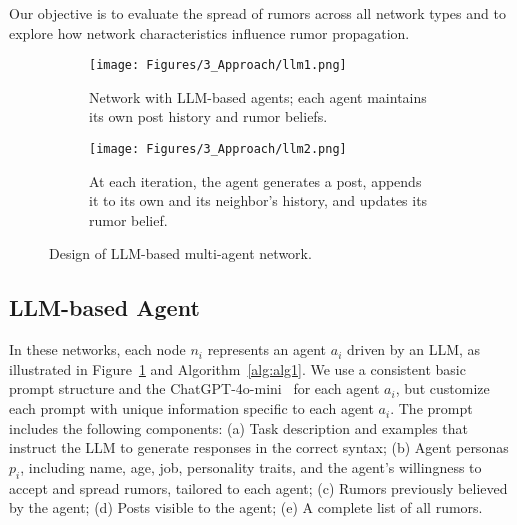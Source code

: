 \noindent Our objective is to evaluate the spread of rumors across all network types and to explore how network characteristics influence rumor propagation.

\begin{figure}[ht]
    \centering
    \begin{subfigure}[t]{0.21\textwidth}
        \centering
        \texttt{[image: Figures/3\_Approach/llm1.png]}
        \caption{Network with LLM-based agents; each agent maintains its own post history and rumor beliefs.}
        \label{fig:llm_a}
    \end{subfigure}
    \hspace{0.04\textwidth}
    \begin{subfigure}[t]{0.21\textwidth}
        \centering
        \texttt{[image: Figures/3\_Approach/llm2.png]}
        \caption{At each iteration, the agent generates a post, appends it to its own and its neighbor’s history, and updates its rumor belief.
        }
        \label{fig:llm_b}
    \end{subfigure}
    \vspace{-2ex}
    \caption{Design of LLM-based multi-agent network.}
    \label{fig:main_figure}
    \vspace{-2ex}
\end{figure}




\subsection{LLM-based Agent} 
In these networks, each node $n_i$ represents an agent $a_i$ driven by an LLM, as illustrated in Figure~\ref{fig:llm_a} and Algorithm~\ref{alg:alg1}. 
We use a consistent basic prompt structure and the ChatGPT-4o-mini~\cite{openai2024chatgpt} for each agent $a_i$, but customize each prompt with unique information specific to each agent $a_i$. 
The prompt includes the following components: 
(a) Task description and examples that instruct the LLM to generate responses in the correct syntax; 
(b) Agent personas $p_{i}$, including name, age, job, personality traits, and the agent’s willingness to accept and spread rumors, tailored to each agent; 
(c) Rumors previously believed by the agent; 
(d) Posts visible to the agent; (e) A complete list of all rumors. 


